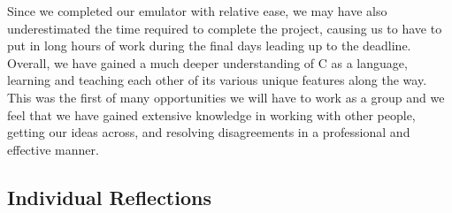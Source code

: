 \documentclass[11pt, letterpaper]{article}
\begin{document}
Since we completed our emulator with relative ease, we may have also underestimated the time required to complete the project, causing us to have to put in long hours of work during the final days leading up to the deadline.
\\ \newline
Overall, we have gained a much deeper understanding of C as a language, learning and teaching each other of its various unique features along the way. This was the first of many opportunities we will have to work as a group and we feel that we have gained extensive knowledge in working with other people, getting our ideas across, and resolving disagreements in a professional and effective manner.
\subsection{Individual Reflections}
\end{document}
